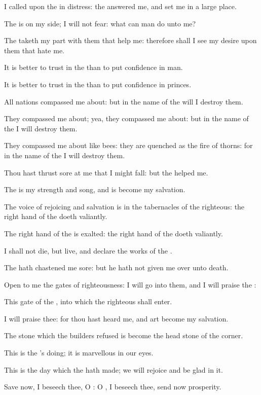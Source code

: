 \verse I called upon the \LORD in distress: the \LORD answered me, and set me in a large place.

\verse The \LORD is on my side; I will not fear: what can man do unto me?

\verse The \LORD taketh my part with them that help me: therefore shall I see my desire upon them that hate me.

\verse It is better to trust in the \LORD than to put confidence in man.

\verse It is better to trust in the \LORD than to put confidence in princes.

\verse All nations compassed me about: but in the name of the \LORD will I destroy them.

\verse They compassed me about; yea, they compassed me about: but in the name of the \LORD I will destroy them.

\verse They compassed me about like bees: they are quenched as the fire of thorns: for in the name of the \LORD I will destroy them.

\verse Thou hast thrust sore at me that I might fall: but the \LORD helped me.

\verse The \LORD is my strength and song, and is become my salvation.

\verse The voice of rejoicing and salvation is in the tabernacles of the righteous: the right hand of the \LORD doeth valiantly.

\verse The right hand of the \LORD is exalted: the right hand of the \LORD doeth valiantly.

\verse I shall not die, but live, and declare the works of the \LORD.

\verse The \LORD hath chastened me sore: but he hath not given me over unto death.

\verse Open to me the gates of righteousness: I will go into them, and I will praise the \LORD:

\verse This gate of the \LORD, into which the righteous shall enter.

\verse I will praise thee: for thou hast heard me, and art become my salvation.

\verse The stone which the builders refused is become the head stone of the corner.

\verse This is the \LORD's doing; it is marvellous in our eyes.

\verse This is the day which the \LORD hath made; we will rejoice and be glad in it.

\verse Save now, I beseech thee, O \LORD: O \LORD, I beseech thee, send now prosperity.

